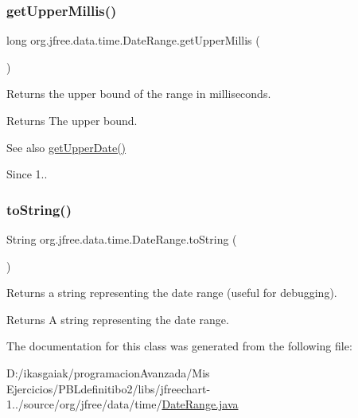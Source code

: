 \subsubsection{\texorpdfstring{get\+Upper\+Millis()}{getUpperMillis()}}
{\footnotesize\ttfamily long org.\+jfree.\+data.\+time.\+Date\+Range.\+get\+Upper\+Millis (\begin{DoxyParamCaption}{ }\end{DoxyParamCaption})}

Returns the upper bound of the range in milliseconds.

\begin{DoxyReturn}{Returns}
The upper bound.
\end{DoxyReturn}
\begin{DoxySeeAlso}{See also}
\mbox{\hyperlink{classorg_1_1jfree_1_1data_1_1time_1_1_date_range_a9b87175cf0549cce3e213c8041e174f8}{get\+Upper\+Date()}}
\end{DoxySeeAlso}
\begin{DoxySince}{Since}
1.. 
\end{DoxySince}
\mbox{\label{classorg_1_1jfree_1_1data_1_1time_1_1_date_range_a2e5075ba7dbb42c3e51d52d30500de64}} 
\subsubsection{\texorpdfstring{to\+String()}{toString()}}
{\footnotesize\ttfamily String org.\+jfree.\+data.\+time.\+Date\+Range.\+to\+String (\begin{DoxyParamCaption}{ }\end{DoxyParamCaption})}

Returns a string representing the date range (useful for debugging).

\begin{DoxyReturn}{Returns}
A string representing the date range. 
\end{DoxyReturn}


The documentation for this class was generated from the following file\+:\begin{DoxyCompactItemize}
\item 
D\+:/ikasgaiak/programacion\+Avanzada/\+Mis Ejercicios/\+P\+B\+Ldefinitibo2/libs/jfreechart-\/1../source/org/jfree/data/time/\mbox{\hyperlink{_date_range_8java}{Date\+Range.\+java}}\end{DoxyCompactItemize}
